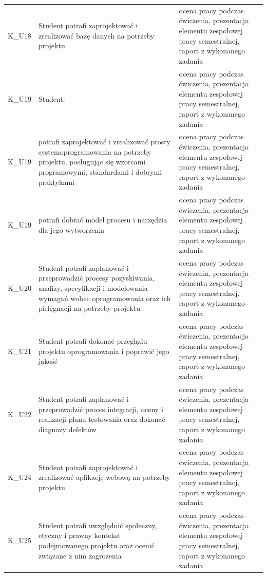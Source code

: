 \documentclass[12pt, a4paper]{article}
\begin{document}
{\begin{longtable}{m{1.6cm}m{9.0cm}m{4.2cm}}
  \rowcolor{tableRowAlt} K\_U18 & Student potrafi zaprojektować i zrealizować bazę danych na potrzeby projektu & ocena pracy podczas ćwiczenia, prezentacja elementu zespołowej pracy semestralnej, raport z wykonanego zadania \\
  \rowcolor{tableRowLight} K\_U19 & Student: & ocena pracy podczas ćwiczenia, prezentacja elementu zespołowej pracy semestralnej, raport z wykonanego zadania \\
  \rowcolor{tableRowAlt} K\_U19 & potrafi zaprojektować i zrealizować prosty systemoprogramowania na potrzeby projektu, posługując się wzorcami programowymi, standardami i dobrymi praktykami & ocena pracy podczas ćwiczenia, prezentacja elementu zespołowej pracy semestralnej, raport z wykonanego zadania \\
  \rowcolor{tableRowLight} K\_U19 & potrafi dobrać model procesu i narzędzia dla jego wytworzenia & ocena pracy podczas ćwiczenia, prezentacja elementu zespołowej pracy semestralnej, raport z wykonanego zadania \\
  \rowcolor{tableRowAlt} K\_U20 & Student potrafi zaplanować i przeprowadzić procesy pozyskiwania, analizy, specyfikacji i modelowania wymagań wobec oprogramowania oraz ich pielęgnacji na potrzeby projektu & ocena pracy podczas ćwiczenia, prezentacja elementu zespołowej pracy semestralnej, raport z wykonanego zadania \\
  \rowcolor{tableRowLight} K\_U21 & Student potrafi dokonać przeglądu projektu oprogramowania i poprawić jego jakość & ocena pracy podczas ćwiczenia, prezentacja elementu zespołowej pracy semestralnej, raport z wykonanego zadania \\
  \rowcolor{tableRowAlt} K\_U22 & Student potrafi zaplanować i przeprowadzić proces integracji, oceny i realizacji planu testowania oraz dokonać diagnozy defektów & ocena pracy podczas ćwiczenia, prezentacja elementu zespołowej pracy semestralnej, raport z wykonanego zadania \\
  \rowcolor{tableRowLight} K\_U24 & Student potrafi zaprojektować i zrealizować aplikację webową na potrzeby projektu & ocena pracy podczas ćwiczenia, prezentacja elementu zespołowej pracy semestralnej, raport z wykonanego zadania \\
  \rowcolor{tableRowAlt} K\_U25 & Student potrafi uwzględnić społeczny, etyczny i prawny kontekst podejmowanego projektu oraz ocenić związane z nim zagrożenia & ocena pracy podczas ćwiczenia, prezentacja elementu zespołowej pracy semestralnej, raport z wykonanego zadania \\

\end{longtable}}
\end{document}
